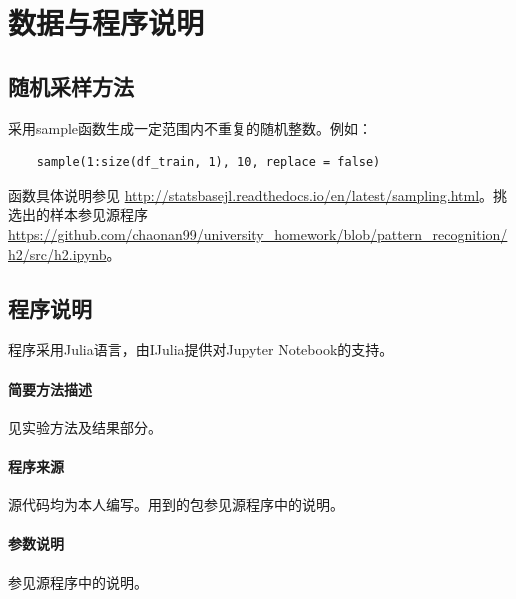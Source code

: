 \section{数据与程序说明}
\subsection{随机采样方法}
采用{\ttfamily sample}函数生成一定范围内不重复的随机整数。例如：
\begin{lstlisting}
	sample(1:size(df_train, 1), 10, replace = false)
\end{lstlisting}
函数具体说明参见 \url{http://statsbasejl.readthedocs.io/en/latest/sampling.html}。挑选出的样本参见源程序 \url{https://github.com/chaonan99/university_homework/blob/pattern_recognition/h2/src/h2.ipynb}。

\subsection{程序说明}
程序采用{\ttfamily Julia}语言，由{\ttfamily IJulia}提供对{\ttfamily Jupyter Notebook}的支持。
\paragraph{简要方法描述} 见实验方法及结果部分。
\paragraph{程序来源} 源代码均为本人编写。用到的包参见源程序中的说明。
\paragraph{参数说明} 参见源程序中的说明。


